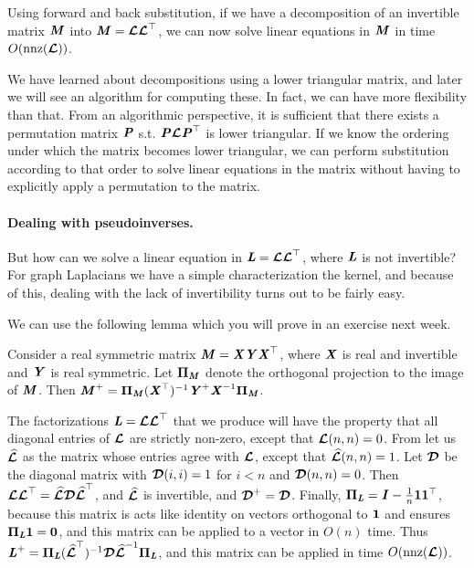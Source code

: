 Using forward and back substitution, if we have a decomposition of an
invertible matrix $\MM$ into $\MM = \matlow \matlow^\trp$, we can now
solve linear equations in $\MM$ in time $O(\nnz(\matlow))$.

\begin{remark}
 We have learned about decompositions using a lower triangular matrix, and later we
 will see an algorithm for computing these.
 In fact, we can have more flexibility than that. From an algorithmic perspective, it is
 sufficient that there exists a permutation matrix $\PP$ s.t. $\PP
 \matlow \PP^{\trp}$ is lower triangular. If we know the ordering
 under which the matrix becomes lower triangular, we can perform
 substitution according to that order to solve linear equations in the
 matrix without having to explicitly apply a permutation to the matrix.
\end{remark}


\paragraph{Dealing with pseudoinverses.} But how can we solve a linear equation in $\LL = \matlow
\matlow^\trp$, where $\LL$ is not invertible? For graph
Laplacians we have a simple characterization the kernel, and because
of this, dealing with the lack of invertibility turns out
to be fairly easy.

We can use the following lemma which you will prove in an exercise
next week.
\begin{lemma}
  Consider a real symmetric matrix $\MM = \XX \YY \XX^\trp$, where
  $\XX$ is real and invertible and
  $\YY$ is real symmetric.
  Let $\proj_{\MM}$ denote the orthogonal projection to the image
  of $\MM$.
  Then $\MM^{\pinv} = \proj_{\MM} (\XX^\trp)^{-1}\YY^{\pinv} \XX^{-1}\proj_{\MM}$.
\end{lemma}

The factorizations $\LL = \matlow \matlow^\trp$ that we produce will
have the property that all diagonal entries of $\matlow$ are strictly
non-zero, except that $\matlow(n,n) = 0$.
From let us $\matlowhat$ as the matrix whose entries
agree with $\matlow$, except that $\matlowhat(n,n) = 1$.
Let $\calDD$ be the diagonal matrix with $\calDD(i,i) = 1$ for $i < n$
and $\calDD(n,n) = 0$.
Then $\matlow \matlow^{\trp} = \matlowhat\calDD
\matlowhat^{\trp}$, and $\matlowhat$ is invertible, and $\calDD^{\pinv} = \calDD$.
Finally, $\proj_{\LL} = \II - \frac{1}{n}\vecone\vecone^{\trp}$,
because this matrix is acts like identity on vectors orthogonal to
$\vecone$ and ensures $\proj_{\LL} \vecone = \veczero$,
and this matrix can be applied to a vector in $O(n)$ time.
Thus $\LL^{\pinv}  = \proj_{\LL}(\matlowhat^\trp)^{-1}\calDD
\matlowhat^{-1}\proj_{\LL}$, and this matrix can be applied in time $O(\nnz(\matlow))$.

